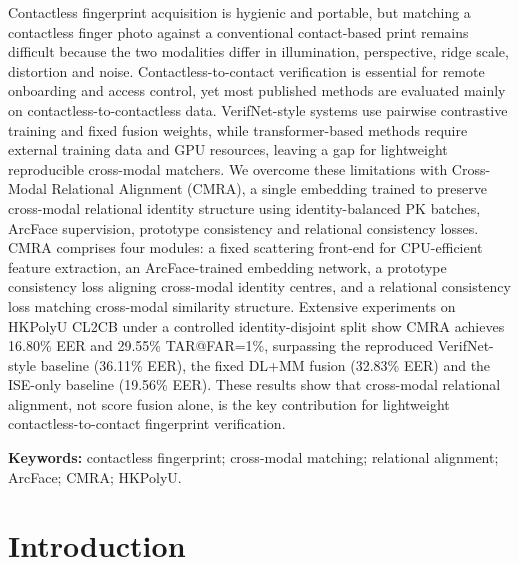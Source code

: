 \documentclass[12pt,a4paper]{article}
\begin{document}
Contactless fingerprint acquisition is hygienic and portable, but matching a contactless finger photo against a conventional contact-based print remains difficult because the two modalities differ in illumination, perspective, ridge scale, distortion and noise. Contactless-to-contact verification is essential for remote onboarding and access control, yet most published methods are evaluated mainly on contactless-to-contactless data. VerifNet-style systems use pairwise contrastive training and fixed fusion weights, while transformer-based methods require external training data and GPU resources, leaving a gap for lightweight reproducible cross-modal matchers. We overcome these limitations with Cross-Modal Relational Alignment (CMRA), a single embedding trained to preserve cross-modal relational identity structure using identity-balanced PK batches, ArcFace supervision, prototype consistency and relational consistency losses. CMRA comprises four modules: a fixed scattering front-end for CPU-efficient feature extraction, an ArcFace-trained embedding network, a prototype consistency loss aligning cross-modal identity centres, and a relational consistency loss matching cross-modal similarity structure. Extensive experiments on HKPolyU CL2CB under a controlled identity-disjoint split show CMRA achieves 16.80\% EER and 29.55\% TAR@FAR=1\%, surpassing the reproduced VerifNet-style baseline (36.11\% EER), the fixed DL+MM fusion (32.83\% EER) and the ISE-only baseline (19.56\% EER). These results show that cross-modal relational alignment, not score fusion alone, is the key contribution for lightweight contactless-to-contact fingerprint verification.

\vspace{0.3cm}
\textbf{Keywords:} contactless fingerprint; cross-modal matching; relational alignment; ArcFace; CMRA; HKPolyU.

\newpage
\tableofcontents
\newpage

\section{Introduction}
\end{document}
